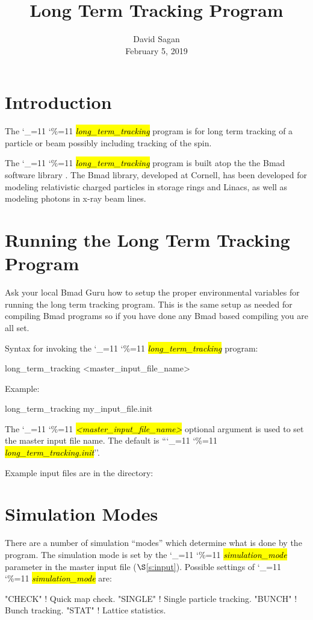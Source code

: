 \documentclass{hitec}
\title{Long Term Tracking Program}
\author{}
\date{David Sagan \\ February 5, 2019}
\newcommand\dottcmd[1]{\hl{\em#1}\endgroup}
\newcommand{\vn}{\begingroup\catcode`\_=11 \catcode`\%=11 \dottcmd}
\newcommand{\ltt}{\vn{long_term_tracking}\xspace}
\newcommand{\sref}[1]{$\S$\ref{#1}}
\newcommand{\Section}[1]{\section{#1}\vspace*{-1ex}}
\begin{document}
\maketitle

\tableofcontents


\Section{Introduction} 

The \ltt program is for long term tracking of a particle or beam possibly
including tracking of the spin.

The \ltt program is built atop the the Bmad software library \cite{b:bmad}. The Bmad library,
developed at Cornell, has been developed for modeling relativistic charged particles in storage
rings and Linacs, as well as modeling photons in x-ray beam lines.

\Section{Running the Long Term Tracking Program} 
\label{s:run}

Ask your local Bmad Guru how to setup the proper environmental variables for running the long term
tracking program. This is the same setup as needed for compiling Bmad programs so if you have done
any Bmad based compiling you are all set. 

Syntax for invoking the \ltt program:
\begin{code}
  long_term_tracking {<master_input_file_name>}
\end{code}
Example:
\begin{code}
  long_term_tracking my_input_file.init
\end{code}
The \vn{<master_input_file_name>} optional argument is used to set the master input file name. The
default is ``\vn{long_term_tracking.init}''.

Example input files are in the directory:

\Section{Simulation Modes}
\label{s:sim.modes}

There are a number of simulation ``modes'' which determine what is done by the program. The
simulation mode is set by the \vn{simulation_mode} parameter in the master input file
(\sref{s:input}).  Possible settings of \vn{simulation_mode} are:
\begin{code}
  "CHECK"   ! Quick map check.
  "SINGLE"  ! Single particle tracking.
  "BUNCH"   ! Bunch tracking.
  "STAT"    ! Lattice statistics.
\end{code}
\end{document}
